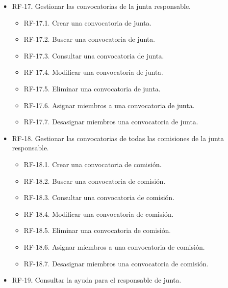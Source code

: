 \begin{itemize}
\begin{itemize}
             \item RF-17. Gestionar las convocatorias de la junta responsable.
             \begin{itemize}
                  \item RF-17.1. Crear una convocatoria de junta.
                  \item RF-17.2. Buscar una convocatoria de junta.
                  \item RF-17.3. Consultar una convocatoria de junta.
                  \item RF-17.4. Modificar una convocatoria de junta.
                  \item RF-17.5. Eliminar una convocatoria de junta.
                  \item RF-17.6. Asignar miembros a una convocatoria de junta.
                  \item RF-17.7. Desasignar miembros una convocatoria de junta.
             \end{itemize}
          \item RF-18. Gestionar las convocatorias de todas las comisiones de la junta responsable.
             \begin{itemize}
                  \item RF-18.1. Crear una convocatoria de comisión.
                  \item RF-18.2. Buscar una convocatoria de comisión.
                  \item RF-18.3. Consultar una convocatoria de comisión.
                  \item RF-18.4. Modificar una convocatoria de comisión.
                  \item RF-18.5. Eliminar una convocatoria de comisión.
                  \item RF-18.6. Asignar miembros a una convocatoria de comisión.
                  \item RF-18.7. Desasignar miembros una convocatoria de comisión.
             \end{itemize} 
         \item RF-19. Consultar la ayuda para el responsable de junta.
     \end{itemize}


\end{itemize}
